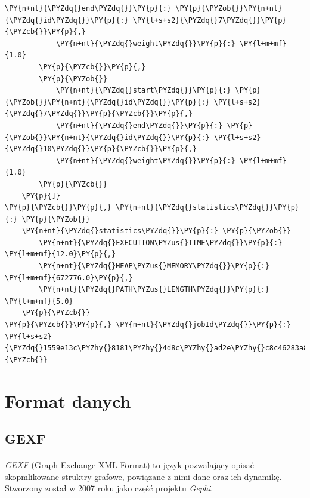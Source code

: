 \begin{program}
\begin{code}
\begin{Verbatim}[commandchars=\\\{\}]
            \PY{n+nt}{\PYZdq{}end\PYZdq{}}\PY{p}{:} \PY{p}{\PYZob{}}\PY{n+nt}{\PYZdq{}id\PYZdq{}}\PY{p}{:} \PY{l+s+s2}{\PYZdq{}7\PYZdq{}}\PY{p}{\PYZcb{}}\PY{p}{,}
            \PY{n+nt}{\PYZdq{}weight\PYZdq{}}\PY{p}{:} \PY{l+m+mf}{1.0}
        \PY{p}{\PYZcb{}}\PY{p}{,}
        \PY{p}{\PYZob{}}
            \PY{n+nt}{\PYZdq{}start\PYZdq{}}\PY{p}{:} \PY{p}{\PYZob{}}\PY{n+nt}{\PYZdq{}id\PYZdq{}}\PY{p}{:} \PY{l+s+s2}{\PYZdq{}7\PYZdq{}}\PY{p}{\PYZcb{}}\PY{p}{,}
            \PY{n+nt}{\PYZdq{}end\PYZdq{}}\PY{p}{:} \PY{p}{\PYZob{}}\PY{n+nt}{\PYZdq{}id\PYZdq{}}\PY{p}{:} \PY{l+s+s2}{\PYZdq{}10\PYZdq{}}\PY{p}{\PYZcb{}}\PY{p}{,}
            \PY{n+nt}{\PYZdq{}weight\PYZdq{}}\PY{p}{:} \PY{l+m+mf}{1.0}
        \PY{p}{\PYZcb{}}
    \PY{p}{]}
\PY{p}{\PYZcb{}}\PY{p}{,} \PY{n+nt}{\PYZdq{}statistics\PYZdq{}}\PY{p}{:} \PY{p}{\PYZob{}}
    \PY{n+nt}{\PYZdq{}statistics\PYZdq{}}\PY{p}{:} \PY{p}{\PYZob{}}
        \PY{n+nt}{\PYZdq{}EXECUTION\PYZus{}TIME\PYZdq{}}\PY{p}{:} \PY{l+m+mf}{12.0}\PY{p}{,}
        \PY{n+nt}{\PYZdq{}HEAP\PYZus{}MEMORY\PYZdq{}}\PY{p}{:} \PY{l+m+mf}{672776.0}\PY{p}{,}
        \PY{n+nt}{\PYZdq{}PATH\PYZus{}LENGTH\PYZdq{}}\PY{p}{:} \PY{l+m+mf}{5.0}
    \PY{p}{\PYZcb{}}
\PY{p}{\PYZcb{}}\PY{p}{,} \PY{n+nt}{\PYZdq{}jobId\PYZdq{}}\PY{p}{:} \PY{l+s+s2}{\PYZdq{}1559e13c\PYZhy{}8181\PYZhy{}4d8c\PYZhy{}ad2e\PYZhy{}c8c46283a82b\PYZdq{}}\PY{p}{\PYZcb{}}
\end{Verbatim}
\end{code}
\label{code:jsonresponse}
\end{program}

\section{Format danych}
\label{sec:data}

\subsection{GEXF}
\paragraph{}
{\it GEXF} (Graph Exchange XML Format) to język pozwalający opisać skopmlikowane struktry grafowe, powiązane z nimi dane oraz ich dynamikę.
Stworzony został w 2007 roku jako część projektu {\it Gephi}.


